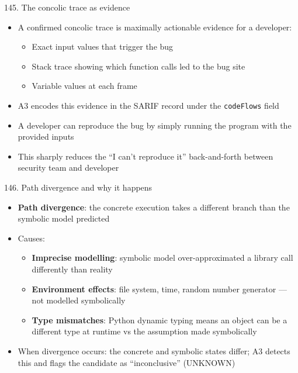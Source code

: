 \documentclass[aspectratio=169]{beamer}
\begin{document}
\begin{frame}{145. The concolic trace as evidence}
\begin{itemize}
  \item A confirmed concolic trace is maximally actionable evidence for a developer:
    \begin{itemize}
      \item Exact input values that trigger the bug
      \item Stack trace showing which function calls led to the bug site
      \item Variable values at each frame
    \end{itemize}
  \item A3 encodes this evidence in the SARIF record under the \texttt{codeFlows} field
  \item A developer can reproduce the bug by simply running the program with the provided inputs
  \item This sharply reduces the ``I can't reproduce it'' back-and-forth between security team and developer
\end{itemize}
\end{frame}

\begin{frame}{146. Path divergence and why it happens}
\begin{itemize}
  \item \textbf{Path divergence}: the concrete execution takes a different branch than the symbolic model predicted
  \item Causes:
    \begin{itemize}
      \item \textbf{Imprecise modelling}: symbolic model over-approximated a library call differently than reality
      \item \textbf{Environment effects}: file system, time, random number generator --- not modelled symbolically
      \item \textbf{Type mismatches}: Python dynamic typing means an object can be a different type at runtime vs the assumption made symbolically
    \end{itemize}
  \item When divergence occurs: the concrete and symbolic states differ; A3 detects this and flags the candidate as ``inconclusive'' (UNKNOWN)
\end{itemize}
\end{frame}
\end{document}
